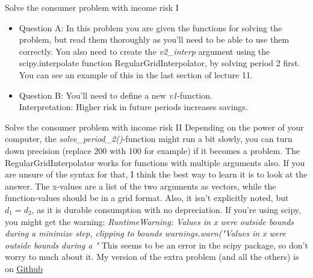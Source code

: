 \documentclass[10pt,danish,t,10pt]{beamer}
\newcommand{\code}[1]{\textit{#1}} %
\begin{document}
\begin{frame}{Solve the consumer problem with income risk I}
\begin{itemize}
    \item Question A: In this problem you are given the functions for solving the problem, but read them thoroughly as you'll need to be able to use them correctly. \newline
    You also need to create the \code{v2\_interp} argument using the scipy.interpolate function RegularGridInterpolator, by solving period 2 first. You can see an example of this in the last section of lecture 11.
    \item Question B: You'll need to define a new \code{v1}-function. \\
    Interpretation: Higher risk in future periods increases savings.
\end{itemize}
\end{frame}

\begin{frame}{Solve the consumer problem with income risk II}
    Depending on the power of your computer, the \code{solve\_period\_2()}-function might run a bit slowly, you can turn down precision (replace 200 with 100 for example) if it becomes a problem. \newline
    The RegularGridInterpolator works for functions with multiple arguments also. If you are unsure of the syntax for that, I think the best way to learn it is to look at the answer. The x-values are a list of the two arguments as vectors, while the function-values should be in a grid format. \newline
    Also, it isn't explicitly noted, but $d_{1}=d_{2}$, as it is durable consumption with no depreciation. \newline 
    If you're using scipy, you might get the warning: \code{RuntimeWarning: Values in x were outside bounds during a minimize step, clipping to bounds warnings.warn("Values in x were outside bounds during a "} \newline
    This seems to be an error in the scipy package, so don't worry to much about it. \newline
    My version of the extra problem (and all the others) is on \href{https://github.com/AskerNC/exercises-2021/blob/master/PS7/problem_set_7-sol.ipynb}{\underline{Github}}
\end{frame}
\end{document}
